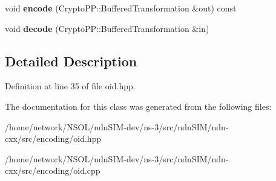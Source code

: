\begin{DoxyCompactItemize}
\item 
void {\bfseries encode} (Crypto\+P\+P\+::\+Buffered\+Transformation \&out) const\hypertarget{classndn_1_1OID_a515c089dfe77399fa88b4177e348fc79}{}\label{classndn_1_1OID_a515c089dfe77399fa88b4177e348fc79}

\item 
void {\bfseries decode} (Crypto\+P\+P\+::\+Buffered\+Transformation \&in)\hypertarget{classndn_1_1OID_ad5f669fab294f2f0d5e155c28a464f01}{}\label{classndn_1_1OID_ad5f669fab294f2f0d5e155c28a464f01}

\end{DoxyCompactItemize}


\subsection{Detailed Description}


Definition at line 35 of file oid.\+hpp.



The documentation for this class was generated from the following files\+:\begin{DoxyCompactItemize}
\item 
/home/network/\+N\+S\+O\+L/ndn\+S\+I\+M-\/dev/ns-\/3/src/ndn\+S\+I\+M/ndn-\/cxx/src/encoding/oid.\+hpp\item 
/home/network/\+N\+S\+O\+L/ndn\+S\+I\+M-\/dev/ns-\/3/src/ndn\+S\+I\+M/ndn-\/cxx/src/encoding/oid.\+cpp\end{DoxyCompactItemize}
